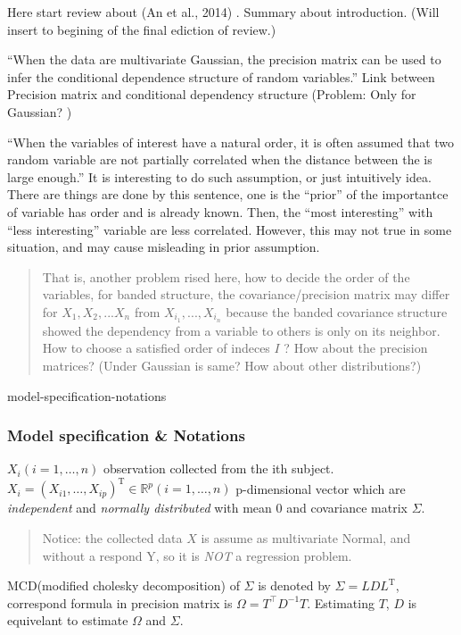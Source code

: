 \documentclass{beamer}
\begin{document}
\begin{frame}

Here start review about (An et al., 2014) . Summary about introduction.
(Will insert to begining of the final ediction of review.)

``When the data are multivariate Gaussian, the precision matrix can be
used to infer the conditional dependence structure of random
variables.'' Link between Precision matrix and conditional dependency
structure (Problem: Only for Gaussian? )

``When the variables of interest have a natural order, it is often
assumed that two random variable are not partially correlated when the
distance between the is large enough.'' It is interesting to do such
assumption, or just intuitively idea. There are things are done by this
sentence, one is the ``prior'' of the importantce of variable has order
and is already known. Then, the ``most interesting'' with ``less
interesting'' variable are less correlated. However, this may not true
in some situation, and may cause misleading in prior assumption.
\end{frame}

\begin{frame}
\begin{quote}
That is, another problem rised here, how to decide the order of the
variables, for banded structure, the covariance/precision matrix may
differ for \(X_1,X_2,...X_n\) from \(X_{i_1},...,X_{i_n}\) because the
banded covariance structure showed the dependency from a variable to
others is only on its neighbor. How to choose a satisfied order of
indeces \(I\) ? How about the precision matrices? (Under Gaussian is
same? How about other distributions?)
\end{quote}
\end{frame}

\begin{frame}{model-specification-notations}
\hypertarget{model-specification-notations}{%
\subsubsection{Model specification \&
Notations}\label{model-specification-notations}}

\(X _ { i } ( i = 1 , \dots , n )\) observation collected from the ith
subject.
\(X _ { i } = \left( X _ { i 1 } , \ldots , X _ { i p } \right) ^ { \mathrm { T } } \in \mathbb { R } ^ { p } ( i = 1 , \dots , n )\)
p-dimensional vector which are \emph{independent} and \emph{normally
distributed} with mean 0 and covariance matrix \(\Sigma\).

\begin{quote}
Notice: the collected data \(X\) is assume as multivariate Normal, and
without a respond Y, so it is \emph{NOT} a regression problem.
\end{quote}

MCD(modified cholesky decomposition) of \(\Sigma\) is denoted by
\(\Sigma = L D L ^ { \mathrm { T } }\), correspond formula in precision
matrix is \(\Omega = T ^ { \top } D ^ { - 1 } T\). Estimating \(T\),
\(D\) is equivelant to estimate \(\Omega\) and \(\Sigma\). 
\end{frame}
\end{document}
